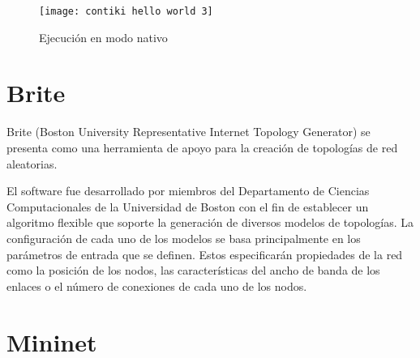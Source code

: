 \begin{figure}[h!]
    \centering
    \texttt{[image: contiki hello world 3]}
    \caption{Ejecución en modo nativo}
    \label{fig:contiki hello world 3}
\end{figure}







\section{Brite}
Brite (Boston University Representative Internet Topology Generator) se presenta como una herramienta de apoyo para la creación de topologías de red aleatorias. 

El software fue desarrollado por miembros del Departamento de Ciencias Computacionales de la Universidad de Boston con el fin de establecer un algoritmo flexible que soporte la generación de diversos modelos de topologías. La configuración de cada uno de los modelos se basa principalmente en los parámetros de entrada que se definen. Estos especificarán propiedades de la red como la posición de los nodos, las características del ancho de banda de los enlaces o el número de conexiones de cada uno de los nodos.


\section{Mininet}











